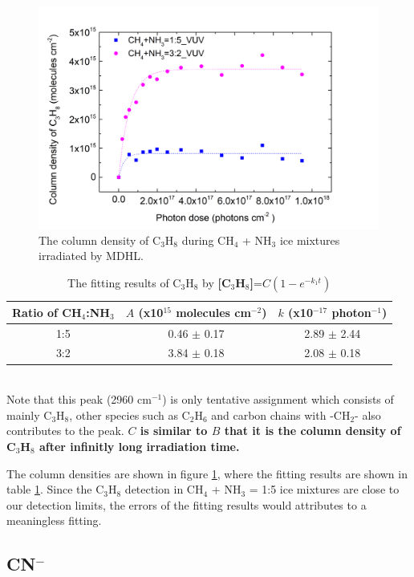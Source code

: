 \begin{figure}
\centering
\includegraphics[width=\textwidth]{figures/chapter3/C3H8_VUV.png}
\caption{The column density of C$_3$H$_8$ during CH$_4$ + NH$_3$ ice mixtures irradiated by MDHL. }
\label{fig:lab_C3H8}
\end{figure}

\begin{table}[htbp]
\caption{The fitting results of C$_3$H$_8$ by \textbf{[C$_3$H$_8$]}=$C(1 - e^{-k_1 t})$}
\label{tab:fittingC3H8}
\begin{tabular}{ccc}
\hline
\hline
Ratio of CH$_4$:NH$_3$ & $A$ (x10$^{15}$ molecules cm$^{-2}$) & $k$ (x10$^{-17}$ photon$^{-1}$) \\
\hline
1:5 & 0.46 $\pm$ 0.17 & 2.89 $\pm$ 2.44 \\
3:2 & 3.84 $\pm$ 0.18 & 2.08 $\pm$ 0.18 \\
\hline
\end{tabular}\\
Note that this peak (2960 cm$^{-1}$) is only tentative assignment which consists of mainly C$_3$H$_8$, other species such as C$_2$H$_6$ and carbon chains with -CH$_2$- also contributes to the peak. \textbf{$C$ is similar to $B$ that it is the column density of C$_3$H$_8$ after infinitly long irradiation time.}
\end{table}

The column densities are shown in figure \ref{fig:lab_C3H8}, where the fitting results are shown in table \ref{tab:fittingC3H8}. Since the C$_3$H$_8$ detection in CH$_4$ + NH$_3$ = 1:5 ice mixtures are close to our detection limits, the errors of the fitting results would attributes to a meaningless fitting.

\subsection{CN$^-$}

